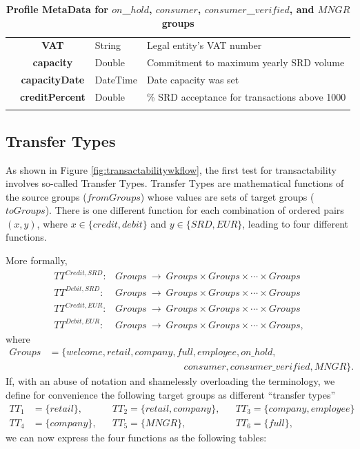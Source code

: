 \begin{table}[H]
\begin{centering}
{\begin{tabular}{ r | c | l | l }
			& {\bf VAT}				&String	& Legal entity's VAT number \\
			& {\bf capacity}				&Double	& Commitment to maximum yearly SRD volume \\
			& {\bf capacityDate}			&DateTime & Date capacity was set \\
			& {\bf creditPercent}			&Double	& \% SRD acceptance for transactions above 1000 \\
\Xhline{1.5pt}
\end{tabular}
}
\caption{\small\textbf{Profile MetaData for $on$\_$hold$, $consumer$, $consumer$\_$verified$, and $MNGR$ groups}}
\label{tab:ProfileMetaData2}
\end{centering}
\end{table}

\subsection{Transfer Types}
As shown in Figure \ref{fig:transactabilitywkflow}, the first test for transactability involves so-called Transfer Types. Transfer Types are mathematical functions of the source groups ($fromGroups$) whose values are sets of target groups ($toGroups$). There is one different function for each combination of ordered pairs $(x, y)$, where $x \in \{ credit, debit \}$ and $y \in \{ SRD, EUR \}$, leading to four different functions.

More formally,
\begin{align}
TT^{Credit,SRD}\colon &Groups\ \rightarrow\ Groups \times Groups \times \cdots \times Groups \\
TT^{Debit,SRD}\colon &Groups\ \rightarrow\ Groups \times Groups \times \cdots \times Groups \\
TT^{Credit,EUR}\colon &Groups\ \rightarrow\ Groups \times Groups \times \cdots \times Groups \\
TT^{Debit,EUR}\colon &Groups\ \rightarrow\ Groups \times Groups \times \cdots \times Groups,
\end{align}
where
\begin{align}
Groups &= \{ welcome, retail, company, full, employee, on\text{\_}hold,  \nonumber \\
		& \qquad\qquad\qquad\qquad\qquad\qquad\qquad
			consumer, consumer\text{\_}verified, MNGR \}.
\end{align}
If, with an abuse of notation and shamelessly overloading the terminology, we define for convenience the following target groups as different ``transfer types''
\begin{align*}
TT_1 &= \{ retail \},		&& TT_2 = \{ retail, company \},		&& TT_3 = \{ company, employee \} \\
TT_4 &= \{ company \},	&& TT_5 = \{ MNGR \},			&& TT_6 = \{ full \},
\end{align*}
we can now express the four functions as the following tables:

